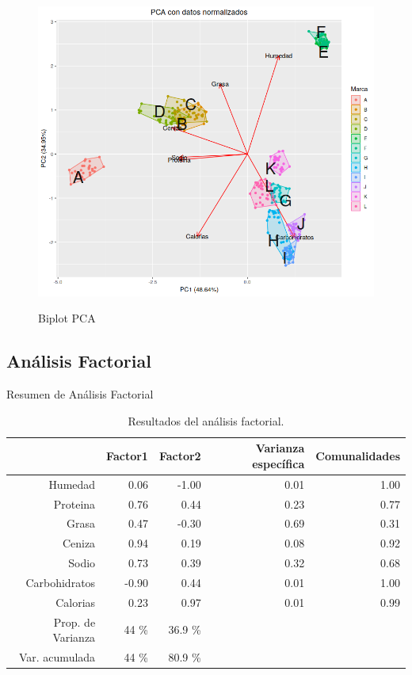 \documentclass[pdf]{beamer}
\begin{document}
\begin{frame}
\begin{figure}[h]
\centering
	\includegraphics[scale=.35]{images/biplotPCA.png} 
	\label{i_biplot_PCA}
	\caption{Biplot PCA}
\end{figure}
\end{frame}

\subsection{Análisis Factorial}

\begin{frame}{Resumen de Análisis Factorial}
\begin{table}[ht]
\begin{adjustbox}{width= 4in,center}
\centering
\begin{tabular}{rrrrr}
  \hline
 & Factor1 & Factor2 & Varianza específica & Comunalidades \\ 
  \hline
Humedad & 0.06 & -1.00 & 0.01 & 1.00 \\ 
  Proteina & 0.76 & 0.44 & 0.23 & 0.77 \\ 
  Grasa & 0.47 & -0.30 & 0.69 & 0.31 \\ 
  Ceniza & 0.94 & 0.19 & 0.08 & 0.92 \\ 
  Sodio & 0.73 & 0.39 & 0.32 & 0.68 \\ 
  Carbohidratos & -0.90 & 0.44 & 0.01 & 1.00 \\ 
  Calorias & 0.23 & 0.97 & 0.01 & 0.99 \\     
  Prop. de Varianza  & 44 \% &  36.9 \% \\
  Var. acumulada & 44 \% &  80.9 \% \\ 
   \hline
\end{tabular}
\end{adjustbox}
	\label{tabla:factores}
	\caption{Resultados del análisis factorial.}	
\end{table}
\end{frame}
\end{document}
